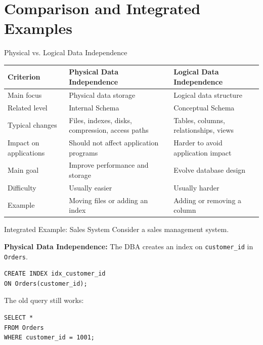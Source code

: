 \documentclass[aspectratio=169,11pt]{beamer}
\begin{document}
\section{Comparison and Integrated Examples}

\begin{frame}{Physical vs. Logical Data Independence}
\scriptsize
\begin{tabularx}{\textwidth}{lXX}
\toprule
\textbf{Criterion} & \textbf{Physical Data Independence} & \textbf{Logical Data Independence} \\
\midrule
Main focus & Physical data storage & Logical data structure \\
Related level & Internal Schema & Conceptual Schema \\
Typical changes & Files, indexes, disks, compression, access paths & Tables, columns, relationships, views \\
Impact on applications & Should not affect application programs & Harder to avoid application impact \\
Main goal & Improve performance and storage & Evolve database design \\
Difficulty & Usually easier & Usually harder \\
Example & Moving files or adding an index & Adding or removing a column \\
\bottomrule
\end{tabularx}
\end{frame}

\begin{frame}[fragile]{Integrated Example: Sales System}
Consider a sales management system.

\vspace{0.2cm}
\textbf{Physical Data Independence:} The DBA creates an index on \texttt{customer\_id} in \texttt{Orders}.
\begin{lstlisting}[style=sqlstyle]
CREATE INDEX idx_customer_id
ON Orders(customer_id);
\end{lstlisting}

The old query still works:
\begin{lstlisting}[style=sqlstyle]
SELECT *
FROM Orders
WHERE customer_id = 1001;
\end{lstlisting}
\end{frame}
\end{document}
